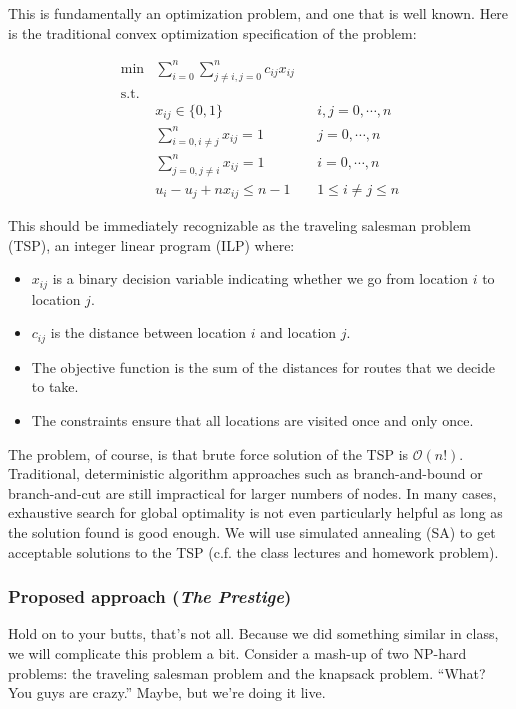 \documentclass{article} %
\begin{document}
This is fundamentally an optimization problem, and one that is well known. Here is the traditional convex optimization
specification of the problem:

\begin{align*}
\min &\sum_{i=0}^n \sum_{j\ne i,j=0}^nc_{ij}x_{ij} &&  \\
\mathrm{s.t.} & \\
	& x_{ij} \in \{0, 1\} && i,j=0, \cdots, n \\
	& \sum_{i=0,i\ne j}^n x_{ij} = 1 && j=0, \cdots, n \\
	& \sum_{j=0,j\ne i}^n x_{ij} = 1 && i=0, \cdots, n \\
	&u_i-u_j +nx_{ij} \le n-1 && 1 \le i \ne j \le n
\end{align*}

This should be immediately recognizable as the traveling salesman problem (TSP), an integer linear program (ILP) where:

\begin{itemize}
  \item $x_{ij}$ is a binary decision variable indicating whether we go from location $i$ to location $j$.
  \item $c_{ij}$ is the distance between location $i$ and location $j$.
  \item The objective function is the sum of the distances for routes that we decide to take.
  \item The constraints ensure that all locations are visited once and only once.
\end{itemize}

The problem, of course, is that brute force solution of the TSP is $\mathcal{O}$$(n!)$. Traditional, deterministic
algorithm approaches such as branch-and-bound or branch-and-cut are still impractical for larger numbers of nodes.
In many cases, exhaustive search for global optimality is not even particularly helpful as long as the solution
found is good enough. We will use simulated annealing (SA) to get acceptable solutions to the TSP (c.f. the class lectures
and homework problem). 

\subsubsection*{Proposed approach (\emph{The Prestige})}

Hold on to your butts, that's not all. Because we did something similar in class, we will complicate
this problem a bit. Consider a mash-up of two NP-hard problems: the traveling salesman problem and the
knapsack problem. ``What? You guys are crazy.'' Maybe, but we're doing it live.
\end{document}
